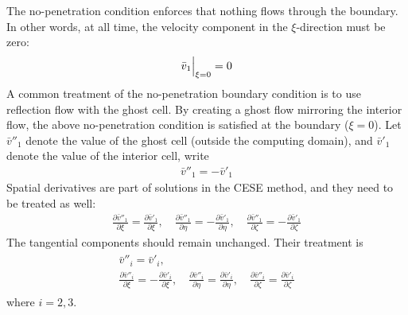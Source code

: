 \documentclass[a4paper,12pt,dvips]{article}
\begin{document}
The no-penetration condition enforces that nothing flows through the boundary.
In other words, at all time, the velocity component in the $\xi$-direction must
be zero:
\begin{align*}
  \Bigl.\bar{v}_1\Bigr|_{\xi=0} = 0
\end{align*}
A common treatment of the no-penetration boundary condition is to use
reflection flow with the ghost cell.  By creating a ghost flow mirroring the
interior flow, the above no-penetration condition is satisfied at the boundary
($\xi = 0$).  Let $\bar{v}''_1$ denote the value of the ghost cell (outside the
computing domain), and $\bar{v}'_1$ denote the value of the interior cell,
write
\begin{align*}
  \bar{v}''_1 = -\bar{v}'_1
\end{align*}
Spatial derivatives are part of solutions in the CESE method, and they need to
be treated as well:
\begin{align*}
  \frac{\partial \bar{v}''_1}{\partial\xi} =
  \frac{\partial \bar{v}'_1}{\partial\xi}, \quad
  \frac{\partial \bar{v}''_1}{\partial\eta} =
  -\frac{\partial \bar{v}'_1}{\partial\eta}, \quad
  \frac{\partial \bar{v}''_1}{\partial\zeta} =
  -\frac{\partial \bar{v}'_1}{\partial\zeta}
\end{align*}
The tangential components should remain unchanged.  Their treatment is
\begin{align*}
\begin{gathered}
  \bar{v}''_i = \bar{v}'_i, \\
  \frac{\partial \bar{v}''_i}{\partial\xi} =
  -\frac{\partial \bar{v}'_i}{\partial\xi}, \quad
  \frac{\partial \bar{v}''_i}{\partial\eta} =
  \frac{\partial \bar{v}'_i}{\partial\eta}, \quad
  \frac{\partial \bar{v}''_i}{\partial\zeta} =
  \frac{\partial \bar{v}'_i}{\partial\zeta}
\end{gathered}
\end{align*}
where $i = 2, 3$.
\end{document}
